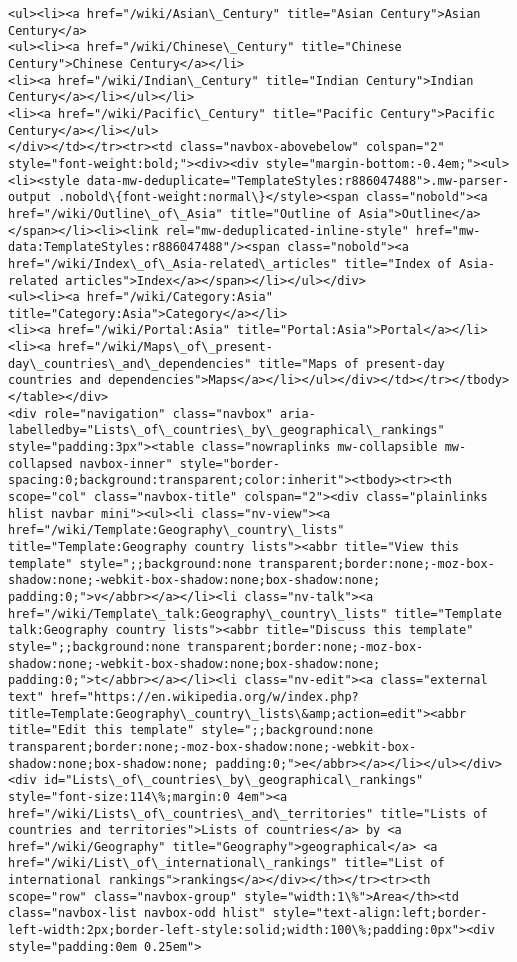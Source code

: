 \documentclass[11pt]{article}
\begin{document}
\begin{Verbatim}[commandchars=\\\{\}]
<ul><li><a href="/wiki/Asian\_Century" title="Asian Century">Asian Century</a>
<ul><li><a href="/wiki/Chinese\_Century" title="Chinese Century">Chinese Century</a></li>
<li><a href="/wiki/Indian\_Century" title="Indian Century">Indian Century</a></li></ul></li>
<li><a href="/wiki/Pacific\_Century" title="Pacific Century">Pacific Century</a></li></ul>
</div></td></tr><tr><td class="navbox-abovebelow" colspan="2" style="font-weight:bold;"><div><div style="margin-bottom:-0.4em;"><ul><li><style data-mw-deduplicate="TemplateStyles:r886047488">.mw-parser-output .nobold\{font-weight:normal\}</style><span class="nobold"><a href="/wiki/Outline\_of\_Asia" title="Outline of Asia">Outline</a></span></li><li><link rel="mw-deduplicated-inline-style" href="mw-data:TemplateStyles:r886047488"/><span class="nobold"><a href="/wiki/Index\_of\_Asia-related\_articles" title="Index of Asia-related articles">Index</a></span></li></ul></div>
<ul><li><a href="/wiki/Category:Asia" title="Category:Asia">Category</a></li>
<li><a href="/wiki/Portal:Asia" title="Portal:Asia">Portal</a></li>
<li><a href="/wiki/Maps\_of\_present-day\_countries\_and\_dependencies" title="Maps of present-day countries and dependencies">Maps</a></li></ul></div></td></tr></tbody></table></div>
<div role="navigation" class="navbox" aria-labelledby="Lists\_of\_countries\_by\_geographical\_rankings" style="padding:3px"><table class="nowraplinks mw-collapsible mw-collapsed navbox-inner" style="border-spacing:0;background:transparent;color:inherit"><tbody><tr><th scope="col" class="navbox-title" colspan="2"><div class="plainlinks hlist navbar mini"><ul><li class="nv-view"><a href="/wiki/Template:Geography\_country\_lists" title="Template:Geography country lists"><abbr title="View this template" style=";;background:none transparent;border:none;-moz-box-shadow:none;-webkit-box-shadow:none;box-shadow:none; padding:0;">v</abbr></a></li><li class="nv-talk"><a href="/wiki/Template\_talk:Geography\_country\_lists" title="Template talk:Geography country lists"><abbr title="Discuss this template" style=";;background:none transparent;border:none;-moz-box-shadow:none;-webkit-box-shadow:none;box-shadow:none; padding:0;">t</abbr></a></li><li class="nv-edit"><a class="external text" href="https://en.wikipedia.org/w/index.php?title=Template:Geography\_country\_lists\&amp;action=edit"><abbr title="Edit this template" style=";;background:none transparent;border:none;-moz-box-shadow:none;-webkit-box-shadow:none;box-shadow:none; padding:0;">e</abbr></a></li></ul></div><div id="Lists\_of\_countries\_by\_geographical\_rankings" style="font-size:114\%;margin:0 4em"><a href="/wiki/Lists\_of\_countries\_and\_territories" title="Lists of countries and territories">Lists of countries</a> by <a href="/wiki/Geography" title="Geography">geographical</a> <a href="/wiki/List\_of\_international\_rankings" title="List of international rankings">rankings</a></div></th></tr><tr><th scope="row" class="navbox-group" style="width:1\%">Area</th><td class="navbox-list navbox-odd hlist" style="text-align:left;border-left-width:2px;border-left-style:solid;width:100\%;padding:0px"><div style="padding:0em 0.25em">

\end{Verbatim}
\end{document}
